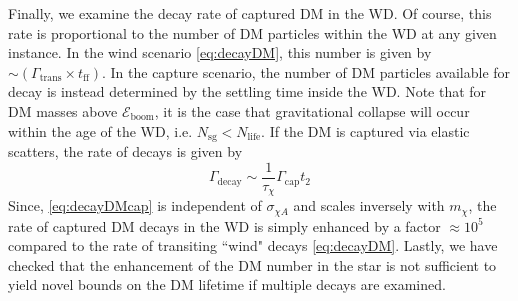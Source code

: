 \documentclass[preprintnumbers,amsmath,amssymb,prd,superscriptaddress]{revtex4}
\newcommand{\Eboom}{\mathcal{E}_\text{boom}}
\begin{document}
Finally, we examine the decay rate of captured DM in the WD. 
Of course, this rate is proportional to the number of DM particles within the WD at any given instance.  
In the wind scenario \eqref{eq:decayDM}, this number is given by $\sim (\Gamma_\text{trans} \times t_\text{ff})$.  
In the capture scenario, the number of DM particles available for decay is instead determined by the settling time inside the WD. 
Note that for DM masses above $\Eboom$, it is the case that gravitational collapse will occur within the age of the WD, i.e. $N_\text{sg} < N_\text{life}$. 
If the DM is captured via elastic scatters, the rate of decays is given by
\begin{equation}
\Gamma_\text{decay} \sim  \frac{1}{\tau_\chi} \Gamma_\text{cap} t_2
\label{eq:decayDMcap}
\end{equation}
Since, \eqref{eq:decayDMcap} is independent of $\sigma_{\chi A}$ and scales inversely with $m_\chi$, the rate of captured DM decays in the WD is simply enhanced by a factor $\approx 10^5$ compared to the rate of transiting ``wind" decays \eqref{eq:decayDM}.  
Lastly, we have checked that the enhancement of the DM number in the star is not sufficient to yield novel bounds on the DM lifetime if multiple decays are examined. 
\end{document}
